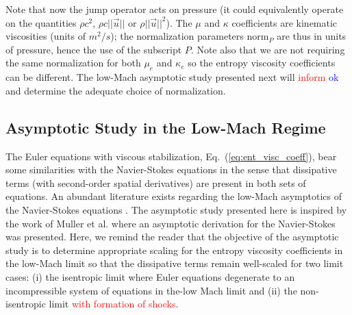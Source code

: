 \documentclass[preprint,10pt]{elsarticle}
\newcommand{\norm}{\textrm{norm}}
\newcommand{\eqt}[1]{Eq.~(\ref{#1})}                     %
\newcommand{\sct}[1]{Section~\ref{#1}}                   %
\newcommand{\tcr}[1]{\textcolor{red}{#1}}
\newcommand{\tcb}[1]{\textcolor{blue}{#1}}
\begin{document}
%
Note that now the jump operator acts on pressure (it could equivalently operate on the quantities $\rho c^2$, $\rho c || \vec{u} ||$ or $\rho || \vec{u} ||^2$). The $\mu$ and $\kappa$ coefficients are kinematic viscosities (units of $m^2/s$); the normalization parameters $\norm_P$ are thus in units of pressure, hence the use of the subscript $P$.  Note also that we are not requiring the same normalization for both $\mu_e$ and $\kappa_e$ so the entropy viscosity coefficients can be different. The low-Mach asymptotic study presented next will \tcr{inform} \tcb{ok} and determine the adequate choice of normalization.


\subsection{Asymptotic Study in the Low-Mach Regime} \label{sec:lowMach}

The Euler equations with viscous stabilization, \eqt{eq:ent_visc_coeff}, bear some similarities with the Navier-Stokes equations in the sense that dissipative terms (with second-order spatial derivatives) are present in both sets of equations. An abundant literature exists regarding the low-Mach asymptotics of the Navier-Stokes equations \cite{LowMach1, LowMach2, LowMach3, Muller}.   
%
The asymptotic study presented here is inspired by the work of Muller et al. \cite{Muller} where an asymptotic derivation for the Navier-Stokes was presented. Here, we remind the reader that the objective of the asymptotic study is to determine appropriate scaling for the entropy viscosity coefficients in the low-Mach limit so that the dissipative terms remain well-scaled for two limit cases: (i) the isentropic limit where Euler equations degenerate to an incompressible system of equations in the-low Mach limit and (ii) the non-isentropic limit \tcr{with formation of shocks}.
\end{document}

